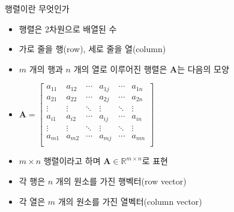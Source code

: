\documentclass{beamer}
\begin{document}
\begin{frame}{행렬이란 무엇인가}

\begin{itemize}
\item 행렬은 2차원으로 배열된 수
\item 가로 줄을 행(row), 세로 줄을 열(column)
\item $m$ 개의 행과 $n$ 개의 열로 이루어진 행렬은 $\mathbf A$는 다음의 모양
\item $\mathbf A = \left [ 
\begin{array}{cccccc}
a_{11} & a_{12} & \cdots & a_{1j} & \cdots & a_{1n} \\
a_{21} & a_{22} & \cdots & a_{2j} & \cdots & a_{2n} \\
\vdots & \vdots & \ddots &   \vdots   & \ddots & \vdots \\
a_{i1} & a_{i2} & \cdots & a_{ij} & \cdots & a_{in} \\
\vdots & \vdots & \ddots & \vdots & \ddots & \vdots\\
a_{m1} & a_{m2} & \cdots & a_{mj} & \cdots & a_{mn} \\
\end{array}
\right ]$
\item $m \times n$ 행렬이라고 하며 $\mathbf A \in \mathbb R^{m\times n}$로 표현
\item 각 행은 $n$ 개의 원소를 가진 행벡터(row vector)
\item 각 열은 $m$ 개의 원소를 가진 열벡터(column vector)
\end{itemize}

\end{frame}


\end{document}
